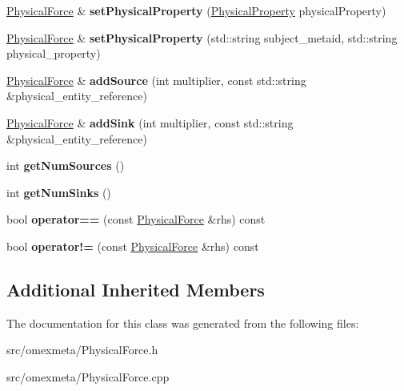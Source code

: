 \begin{DoxyCompactItemize}
\mbox{\label{classomexmeta_1_1PhysicalForce_a081aecc43d16b2fc8826c4050eb2055d}} 
\hyperlink{classomexmeta_1_1PhysicalForce}{Physical\+Force} \& {\bfseries set\+Physical\+Property} (\hyperlink{classomexmeta_1_1PhysicalProperty}{Physical\+Property} physical\+Property)
\item 
\mbox{\label{classomexmeta_1_1PhysicalForce_a3f979432322d40efc8a15cf5ee883100}} 
\hyperlink{classomexmeta_1_1PhysicalForce}{Physical\+Force} \& {\bfseries set\+Physical\+Property} (std\+::string subject\+\_\+metaid, std\+::string physical\+\_\+property)
\item 
\mbox{\label{classomexmeta_1_1PhysicalForce_ace7d3703d7e4bdb9a256208f456f2c4f}} 
\hyperlink{classomexmeta_1_1PhysicalForce}{Physical\+Force} \& {\bfseries add\+Source} (int multiplier, const std\+::string \&physical\+\_\+entity\+\_\+reference)
\item 
\mbox{\label{classomexmeta_1_1PhysicalForce_a8ec5e262b82526ac914d8c7f10b6c2f1}} 
\hyperlink{classomexmeta_1_1PhysicalForce}{Physical\+Force} \& {\bfseries add\+Sink} (int multiplier, const std\+::string \&physical\+\_\+entity\+\_\+reference)
\item 
\mbox{\label{classomexmeta_1_1PhysicalForce_a9910c8edac57daf70faa1f1e2e0208d1}} 
int {\bfseries get\+Num\+Sources} ()
\item 
\mbox{\label{classomexmeta_1_1PhysicalForce_a1135c75705b59afa7037bab313009534}} 
int {\bfseries get\+Num\+Sinks} ()
\item 
\mbox{\label{classomexmeta_1_1PhysicalForce_affa0a1f3cdce0a3336d56658a92c65f3}} 
bool {\bfseries operator==} (const \hyperlink{classomexmeta_1_1PhysicalForce}{Physical\+Force} \&rhs) const
\item 
\mbox{\label{classomexmeta_1_1PhysicalForce_aeb7adb235c0caac04c7aa599f98f258a}} 
bool {\bfseries operator!=} (const \hyperlink{classomexmeta_1_1PhysicalForce}{Physical\+Force} \&rhs) const
\end{DoxyCompactItemize}
\subsection*{Additional Inherited Members}


The documentation for this class was generated from the following files\+:\begin{DoxyCompactItemize}
\item 
src/omexmeta/Physical\+Force.\+h\item 
src/omexmeta/Physical\+Force.\+cpp\end{DoxyCompactItemize}
